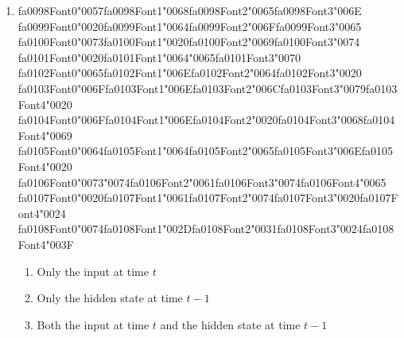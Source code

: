 \documentclass[12pt]{article}
\begin{document}
\begin{enumerate}[label=Q\arabic*.]
\begin{enumerate}[label=(\Alph*)]
    \item The current word given itself
    \item All words simultaneously
\end{enumerate}
\item {\csname fa0098Font0\endcsname\char"0057}{\csname fa0098Font1\endcsname\char"0068}{\csname fa0098Font2\endcsname\char"0065}{\csname fa0098Font3\endcsname\char"006E} {\csname fa0099Font0\endcsname\char"0020}{\csname fa0099Font1\endcsname\char"0064}{\csname fa0099Font2\endcsname\char"006F}{\csname fa0099Font3\endcsname\char"0065} {\csname fa0100Font0\endcsname\char"0073}{\csname fa0100Font1\endcsname\char"0020}{\csname fa0100Font2\endcsname\char"0069}{\csname fa0100Font3\endcsname\char"0074} {\csname fa0101Font0\endcsname\char"0020}{\csname fa0101Font1\endcsname\char"0064}{\char"0065}{\csname fa0101Font3\endcsname\char"0070} {\csname fa0102Font0\endcsname\char"0065}{\csname fa0102Font1\endcsname\char"006E}{\csname fa0102Font2\endcsname\char"0064}{\csname fa0102Font3\endcsname\char"0020} {\csname fa0103Font0\endcsname\char"006F}{\csname fa0103Font1\endcsname\char"006E}{\csname fa0103Font2\endcsname\char"006C}{\csname fa0103Font3\endcsname\char"0079}{\csname fa0103Font4\endcsname\char"0020} {\csname fa0104Font0\endcsname\char"006F}{\csname fa0104Font1\endcsname\char"006E}{\csname fa0104Font2\endcsname\char"0020}{\csname fa0104Font3\endcsname\char"0068}{\csname fa0104Font4\endcsname\char"0069} {\csname fa0105Font0\endcsname\char"0064}{\csname fa0105Font1\endcsname\char"0064}{\csname fa0105Font2\endcsname\char"0065}{\csname fa0105Font3\endcsname\char"006E}{\csname fa0105Font4\endcsname\char"0020} {\csname fa0106Font0\endcsname\char"0073}{\char"0074}{\csname fa0106Font2\endcsname\char"0061}{\csname fa0106Font3\endcsname\char"0074}{\csname fa0106Font4\endcsname\char"0065} {\csname fa0107Font0\endcsname\char"0020}{\csname fa0107Font1\endcsname\char"0061}{\csname fa0107Font2\endcsname\char"0074}{\csname fa0107Font3\endcsname\char"0020}{\csname fa0107Font4\endcsname\char"0024} {\csname fa0108Font0\endcsname\char"0074}{\csname fa0108Font1\endcsname\char"002D}{\csname fa0108Font2\endcsname\char"0031}{\csname fa0108Font3\endcsname\char"0024}{\csname fa0108Font4\endcsname\char"003F}
\begin{enumerate}[label=(\Alph*)]
    \item Only the input at time $t$
    \item Only the hidden state at time $t-1$
    \item Both the input at time $t$ and the hidden state at time $t-1$

\end{enumerate}
\end{enumerate}
\end{document}
